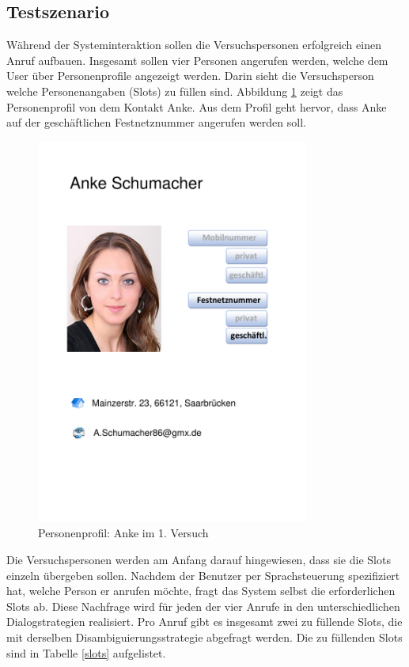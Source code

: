 \documentclass[12pt,a4paper]{scrartcl}
\begin{document}
\subsection{Testszenario}
\label{testszenario1}
Während der Systeminteraktion sollen die Versuchspersonen erfolgreich einen Anruf aufbauen. Insgesamt sollen vier Personen angerufen werden, welche dem User über Personenprofile angezeigt werden.  Darin sieht die Versuchsperson welche Personenangaben (Slots) zu füllen sind. Abbildung \ref{anke} zeigt das Personenprofil von dem Kontakt Anke. Aus dem Profil geht hervor, dass Anke auf der geschäftlichen Festnetznummer angerufen werden soll. 
\begin{figure}[H]
\begin{center}
\includegraphics[width=9cm]{Anke.pdf}
\caption{Personenprofil: Anke im 1. Versuch}
\label{anke}
\end{center}
\end{figure}
Die Versuchspersonen werden am Anfang darauf hingewiesen, dass sie die Slots einzeln übergeben sollen. Nachdem der Benutzer per Sprachsteuerung spezifiziert hat, welche Person er anrufen möchte, fragt das System selbst die erforderlichen Slots ab. Diese Nachfrage wird für jeden der vier Anrufe in den unterschiedlichen Dialogstrategien realisiert. Pro Anruf gibt es insgesamt zwei zu füllende Slots, die mit derselben Disambiguierungsstrategie abgefragt werden. Die zu füllenden Slots sind in Tabelle \ref{slots} aufgelistet.
\end{document}
